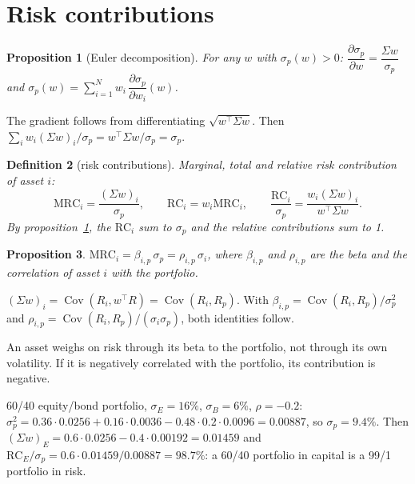 \documentclass[11pt,a4paper]{article}
\makeatletter
\theoremstyle{pdef}
\newtheorem{definition}{Definition}[section]
\theoremstyle{pstate}
\newtheorem{proposition}[definition]{Proposition}
\renewenvironment{proof}[1][\proofname]{\par\pushQED{\qed}\normalfont
  \topsep6pt\trivlist\item[\hskip\labelsep{\sffamily\bfseries #1.}]\ignorespaces}
  {\popQED\endtrivlist\@endpefalse}
\newcommand{\T}{^{\top}}
\newcommand{\pct}{\%}
\DeclareMathOperator{\Cov}{Cov}
\newcommand{\RC}{\mathrm{RC}}
\newcommand{\MRC}{\mathrm{MRC}}
\makeatother
\begin{document}
\section{Risk contributions}\label{sec:rc}

\begin{proposition}[Euler decomposition]\label{prop:euler}
For any $w$ with $\sigma_p(w)>0$:
$\dfrac{\partial\sigma_p}{\partial w}=\dfrac{\Sigma w}{\sigma_p}$ and
$\sigma_p(w)=\sum_{i=1}^Nw_i\,\dfrac{\partial\sigma_p}{\partial w_i}(w)$.
\end{proposition}

\begin{proof}
The gradient follows from differentiating $\sqrt{w\T\Sigma w}$. Then
$\sum_iw_i(\Sigma w)_i/\sigma_p=w\T\Sigma w/\sigma_p=\sigma_p$.
\end{proof}

\begin{definition}[risk contributions]
Marginal, total and relative risk contribution of asset $i$:
\[
\MRC_i=\frac{(\Sigma w)_i}{\sigma_p},\qquad\RC_i=w_i\MRC_i,\qquad
\frac{\RC_i}{\sigma_p}=\frac{w_i(\Sigma w)_i}{w\T\Sigma w}.
\]
By proposition~\ref{prop:euler}, the $\RC_i$ sum to $\sigma_p$ and the relative
contributions sum to 1.
\end{definition}

\begin{proposition}\label{prop:beta}
$\MRC_i=\beta_{i,p}\,\sigma_p=\rho_{i,p}\,\sigma_i$, where $\beta_{i,p}$ and $\rho_{i,p}$
are the beta and the correlation of asset $i$ with the portfolio.
\end{proposition}

\begin{proof}
$(\Sigma w)_i=\Cov(R_i,w\T R)=\Cov(R_i,R_p)$. With
$\beta_{i,p}=\Cov(R_i,R_p)/\sigma_p^2$ and $\rho_{i,p}=\Cov(R_i,R_p)/(\sigma_i\sigma_p)$,
both identities follow.
\end{proof}

An asset weighs on risk through its beta to the portfolio, not through its own
volatility. If it is negatively correlated with the portfolio, its contribution is
negative.

\begin{example}
60/40 equity/bond portfolio, $\sigma_E=16\pct$, $\sigma_B=6\pct$, $\rho=-0.2$:
$\sigma_p^2=0.36\cdot0.0256+0.16\cdot0.0036-0.48\cdot0.2\cdot0.0096=0.00887$, so
$\sigma_p=9.4\pct$. Then $(\Sigma w)_E=0.6\cdot0.0256-0.4\cdot0.00192=0.01459$ and
$\RC_E/\sigma_p=0.6\cdot0.01459/0.00887=98.7\pct$: a 60/40 portfolio in capital is a
99/1 portfolio in risk.
\end{example}
\end{document}
